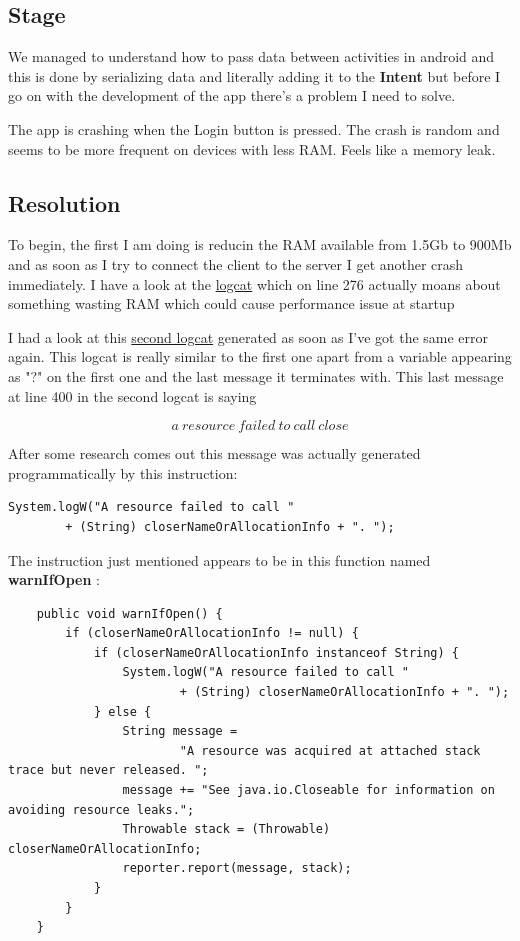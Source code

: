 \documentclass[a4paper,12pt]{book}
\begin{document}
\clearpage

\subsection{Stage}


We managed to understand how to pass data between activities in android and this is done by serializing data and literally adding it to the \textbf{Intent} but before I go on with the development of the app there's a problem I need to solve.

The app is crashing when the Login button is pressed. The crash is random and seems to be more frequent on devices with less RAM. Feels like a memory leak.

\subsection{Resolution}

To begin, the first I am doing is reducin the RAM available from 1.5Gb to 900Mb and as soon as I try to connect the client to the server I get another crash immediately. I have a look at the \href{https://github.com/danieledellacioppa/ACL-Assignments/blob/main/portfolio/verbose-logcat}{logcat} which on line 276 actually moans about something wasting RAM which could cause performance issue at startup

I had a look at this \href{https://github.com/danieledellacioppa/ACL-Assignments/blob/main/portfolio/2nd-verbose-logcat}{second logcat} generated as soon as I've got the same error again.
This logcat is really similar to the first one apart from a variable appearing as "?" on the first one and the last message it terminates with. This last message at line 400 in the second logcat is saying 

\[a \ resource \ failed \ to \ call \ close\]


After some research comes out this message was actually generated programmatically by this instruction: 

\begin{lstlisting}
System.logW("A resource failed to call "
        + (String) closerNameOrAllocationInfo + ". ");
\end{lstlisting}

The instruction just mentioned appears to be in this function named \textbf{warnIfOpen} :

\begin{lstlisting}
    public void warnIfOpen() {
        if (closerNameOrAllocationInfo != null) {
            if (closerNameOrAllocationInfo instanceof String) {
                System.logW("A resource failed to call "
                        + (String) closerNameOrAllocationInfo + ". ");
            } else {
                String message =
                        "A resource was acquired at attached stack trace but never released. ";
                message += "See java.io.Closeable for information on avoiding resource leaks.";
                Throwable stack = (Throwable) closerNameOrAllocationInfo;
                reporter.report(message, stack);
            }
        }
    }
\end{lstlisting}
\end{document}
